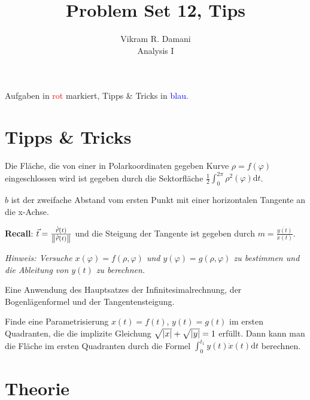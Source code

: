 \documentclass[12pt]{article}
\newcommand{\dt}{\mathrm{d}t}
\newenvironment{problem}[2][\textcolor{blue}{Tipps \& Tricks zu}]{\begin{trivlist}
        \item[\hskip \labelsep {\bfseries #1}\hskip \labelsep {\bfseries \textcolor{blue}{#2}.}]}{\end{trivlist}}
\begin{document}
\title{Problem Set 12, Tips}
\author{Vikram R. Damani\\
    Analysis I}

\maketitle
Aufgaben in \textcolor{red}{rot} markiert, Tipps \& Tricks in \textcolor{blue}{blau}.

\section{Tipps \& Tricks}
\begin{problem}{(1), (2a)}
Die Fläche, die von einer in Polarkoordinaten gegeben Kurve $\rho=f(\varphi)$ eingeschlossen wird ist gegeben durch die Sektorfläche $\frac{1}{2}\int_0^{2\pi}\rho^2(\varphi)\dt$.
\end{problem}

\begin{problem}{(2b)}
$b$ ist der zweifache Abstand vom ersten Punkt mit einer horizontalen Tangente an die x-Achse.

\textbf{Recall}: $\vec{t}=\frac{\dot{\vec{r}}(t)}{\norm{\dot{\vec{r}}(t)}}$ und die Steigung der Tangente ist gegeben durch $m=\frac{\dot{y(t)}}{\dot{x}(t)}$.

\textit{Hinweis: Versuche $x(\varphi)=f(\rho,\varphi)$ und $y(\varphi)=g(\rho,\varphi)$ zu bestimmen und die Ableitung von $y(t)$ zu berechnen.}
\end{problem}

\begin{problem}{(3)}
Eine Anwendung des Hauptsatzes der Infinitesimalrechnung, der Bogenlägenformel und der Tangentensteigung.
\end{problem}

\begin{problem}{(4)}
Finde eine Parametrisierung $x(t) = f(t)$, $y(t) = g(t)$ im ersten Quadranten, die die implizite Gleichung $\sqrt{\abs{x}}+\sqrt{\abs{y}}=1$ erfüllt. Dann kann man die Fläche im ersten Quadranten durch die Formel $\int_0^{t_1} y(t)\dot{x}(t)\dt$ berechnen.
\end{problem}

\section{Theorie}
\end{document}
